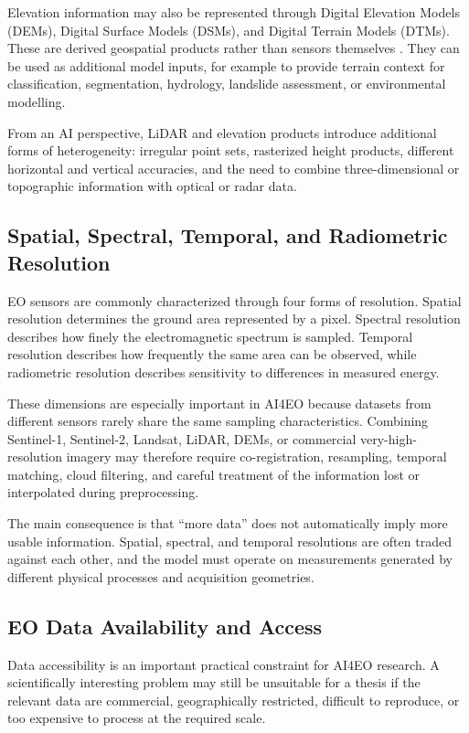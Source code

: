 \documentclass[
    11pt,
    a4paper,
    parskip=half,
    bibliography=totoc,
    numbers=noenddot
]{scrartcl}
\begin{document}
Elevation information may also be represented through Digital Elevation
Models (DEMs), Digital Surface Models (DSMs), and Digital Terrain Models
(DTMs). These are derived geospatial products rather than sensors
themselves \cite{guth2021dem,usgs_dem_definition}. They can be used as
additional model inputs, for example to provide terrain context for
classification, segmentation, hydrology, landslide assessment, or
environmental modelling.

From an AI perspective, LiDAR and elevation products introduce additional
forms of heterogeneity: irregular point sets, rasterized height products,
different horizontal and vertical accuracies, and the need to combine
three-dimensional or topographic information with optical or radar data.

\subsection{Spatial, Spectral, Temporal, and Radiometric Resolution}

EO sensors are commonly characterized through four forms of resolution.
Spatial resolution determines the ground area represented by a pixel.
Spectral resolution describes how finely the electromagnetic spectrum is
sampled. Temporal resolution describes how frequently the same area can
be observed, while radiometric resolution describes sensitivity to
differences in measured energy.

These dimensions are especially important in AI4EO because datasets from
different sensors rarely share the same sampling characteristics.
Combining Sentinel-1, Sentinel-2, Landsat, LiDAR, DEMs, or commercial
very-high-resolution imagery may therefore require co-registration,
resampling, temporal matching, cloud filtering, and careful treatment of
the information lost or interpolated during preprocessing.

The main consequence is that ``more data'' does not automatically imply
more usable information. Spatial, spectral, and temporal resolutions are
often traded against each other, and the model must operate on
measurements generated by different physical processes and acquisition
geometries.

\subsection{EO Data Availability and Access}

Data accessibility is an important practical constraint for AI4EO
research. A scientifically interesting problem may still be unsuitable
for a thesis if the relevant data are commercial, geographically
restricted, difficult to reproduce, or too expensive to process at the
required scale.
\end{document}
